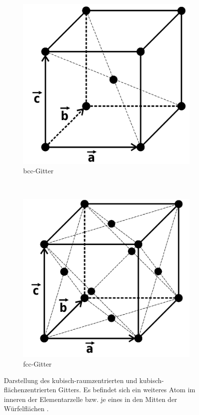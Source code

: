 \begin{figure}[htbp]
	\centering
	\begin{subfigure}[b]{0.3\textwidth}
		\includegraphics[width=\textwidth]{../pics/bcc.png}
		\caption{bcc-Gitter}
		\label{pic:bcc}
	\end{subfigure}
	~ %
	\begin{subfigure}[b]{0.3\textwidth}
		\includegraphics[width=\textwidth]{../pics/fcc.png}
		\caption{fcc-Gitter}
		\label{pic:fcc}
	\end{subfigure}
	\caption{Darstellung des kubisch-raumzentrierten und kubisch-flächenzentrierten Gitters. Es befindet sich ein weiteres Atom im inneren der Elementarzelle bzw. je eines in den Mitten der Würfelflächen \cite{Anleitung}.}
	\label{pic:gitterTyp1}
\end{figure}

